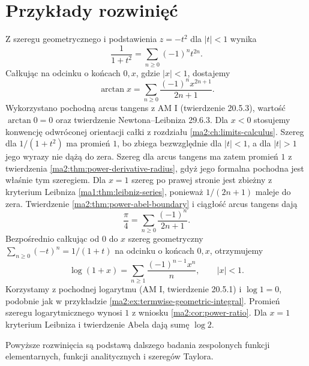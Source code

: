 \section{Przykłady rozwinięć}

\begin{przyklad}
\label{ma2:ex:power-log-arctan}
Z szeregu geometrycznego i podstawienia $z=-t^2$
dla $|t|<1$ wynika
\[
 \frac1{1+t^2}=\sum_{n\ge0}(-1)^nt^{2n}.
\]
Całkując na odcinku o końcach $0,x$,
gdzie $|x|<1$, dostajemy
\[
 \arctan x=\sum_{n\ge0}\frac{(-1)^nx^{2n+1}}{2n+1}.
\]
Wykorzystano pochodną arcus tangens z AM I
(twierdzenie 20.5.3), wartość $\arctan0=0$
oraz twierdzenie Newtona--Leibniza 29.6.3.
Dla $x<0$ stosujemy konwencję odwróconej
orientacji całki z rozdziału
\ref{ma2:ch:limits-calculus}.
Szereg dla $1/(1+t^2)$ ma promień $1$,
bo zbiega bezwzględnie dla $|t|<1$, a dla
$|t|>1$ jego wyrazy nie dążą do zera.
Szereg dla arcus tangens ma zatem promień
$1$ z twierdzenia \ref{ma2:thm:power-derivative-radius},
gdyż jego formalna pochodna jest właśnie
tym szeregiem. Dla $x=1$ szereg po prawej stronie jest
zbieżny z kryterium Leibniza
\ref{ma1:thm:leibniz-series}, ponieważ
$1/(2n+1)$ maleje do zera. Twierdzenie
\ref{ma2:thm:power-abel-boundary} i ciągłość
arcus tangens dają
\[
 \frac{\pi}{4}=\sum_{n\ge0}\frac{(-1)^n}{2n+1}.
\]
Bezpośrednio całkując od $0$ do $x$ szereg
geometryczny $\sum_{n\ge0}(-t)^n=1/(1+t)$
na odcinku o końcach $0,x$, otrzymujemy
\[
 \log(1+x)=\sum_{n\ge1}\frac{(-1)^{n-1}x^n}{n},
 \qquad |x|<1.
\]
Korzystamy z pochodnej logarytmu
(AM I, twierdzenie 20.5.1) i $\log1=0$,
podobnie jak w przykładzie
\ref{ma2:ex:termwise-geometric-integral}.
Promień szeregu logarytmicznego wynosi $1$
z wniosku \ref{ma2:cor:power-ratio}.
Dla $x=1$ kryterium Leibniza
i twierdzenie Abela dają sumę $\log2$.
\end{przyklad}

Powyższe rozwinięcia są podstawą dalszego
badania zespolonych funkcji elementarnych,
funkcji analitycznych i szeregów Taylora.
